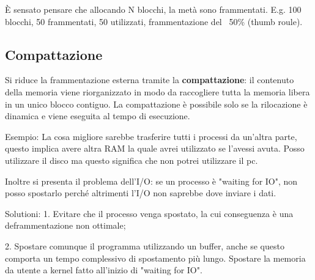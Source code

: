 È sensato pensare che allocando N blocchi, la metà sono frammentati. E.g. 100 blocchi, 50 frammentati, 50 utilizzati, frammentazione del ~50\% (thumb roule).

\subsection{Compattazione}
Si riduce la frammentazione esterna tramite la \textbf{compattazione}: il contenuto della memoria viene riorganizzato in modo da raccogliere tutta la memoria libera in un unico blocco contiguo. La compattazione è possibile solo se la rilocazione è dinamica e viene eseguita al tempo di esecuzione.

Esempio: La cosa migliore sarebbe trasferire tutti i processi da un'altra parte, questo implica
avere altra RAM la quale avrei utilizzato se l'avessi avuta. Posso utilizzare il disco ma questo
significa che non potrei utilizzare il  pc.

Inoltre si presenta il problema dell'I/O: se un processo è "waiting for IO",
non posso spostarlo perché altrimenti l'I/O non saprebbe dove inviare i dati.

Solutioni: 1. Evitare che il processo venga spostato, la cui conseguenza è una
deframmentazione non ottimale;

2. Spostare comunque il programma utilizzando un buffer, anche se questo comporta
un tempo complessivo di spostamento più lungo. Spostare la memoria da utente a kernel fatto all'inizio di "waiting for IO".



